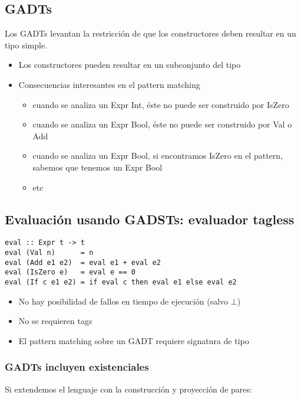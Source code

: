 \documentclass{article}
\newcommand{\imp}[1]{\textcolor{color1}{#1}}
\begin{document}
\subsection{GADTs}

Los GADTs levantan la restricción de que los constructores deben resultar en un tipo simple.

\begin{itemize}
\item Los constructores pueden resultar en un subconjunto del tipo
\item Consecuencias interesantes en el pattern matching
\begin{itemize}
\item cuando se analiza un \imp{Expr Int}, éste no puede ser construido por \imp{IsZero}
\item cuando se analiza un \imp{Expr Bool}, éste no puede ser construido
por \imp{Val} o \imp{Add}
\item cuando se analiza un \imp{Expr Bool}, si encontramos \imp{IsZero} en el
pattern, sabemos que tenemos un \imp{Expr Bool}
\item etc
\end{itemize}
\end{itemize}

\subsection{Evaluación usando GADSTs: evaluador tagless}

\begin{lstlisting}
eval :: Expr t -> t
eval (Val n)      = n
eval (Add e1 e2)  = eval e1 + eval e2
eval (IsZero e)   = eval e == 0
eval (If c e1 e2) = if eval c then eval e1 else eval e2
\end{lstlisting}

\begin{itemize}
\item No hay posibilidad de fallos en tiempo de ejecución (salvo $\bot$)
\item No se requieren tags
\item El pattern matching sobre un GADT requiere signatura de tipo
\end{itemize}

\subsubsection{GADTs incluyen existenciales}

Si extendemos el lenguaje con la construcción y proyección de
pares:
\end{document}
